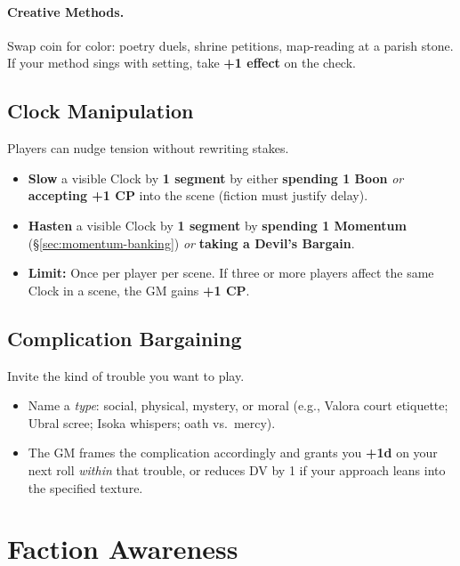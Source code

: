 \begin{multicols}{2}
\paragraph{Creative Methods.}
Swap coin for color: poetry duels, shrine petitions, map-reading at a parish stone. If your method sings with setting, take \textbf{+1 effect} on the check.%

\subsection{Clock Manipulation}
\label{sec:clock-manip}

Players can nudge tension without rewriting stakes.
\begin{itemize}
  \item \textbf{Slow} a visible Clock by \textbf{1 segment} by either \textbf{spending 1 Boon} \emph{or} \textbf{accepting +1 CP} into the scene (fiction must justify delay).
  \item \textbf{Hasten} a visible Clock by \textbf{1 segment} by \textbf{spending 1 Momentum} (\S\ref{sec:momentum-banking}) \emph{or} \textbf{taking a Devil’s Bargain}. 
  \item \textbf{Limit:} Once per player per scene. If three or more players affect the same Clock in a scene, the GM gains \textbf{+1 CP}.
\end{itemize}

\subsection{Complication Bargaining}

Invite the kind of trouble you want to play.
\begin{itemize}
  \item Name a \emph{type}: social, physical, mystery, or moral (e.g., Valora court etiquette; Ubral scree; Isoka whispers; oath vs.\ mercy).
  \item The GM frames the complication accordingly and grants you \textbf{+1d} on your next roll \emph{within} that trouble, or reduces DV by 1 if your approach leans into the specified texture.
\end{itemize}

\section{Faction Awareness}


\end{multicols}
